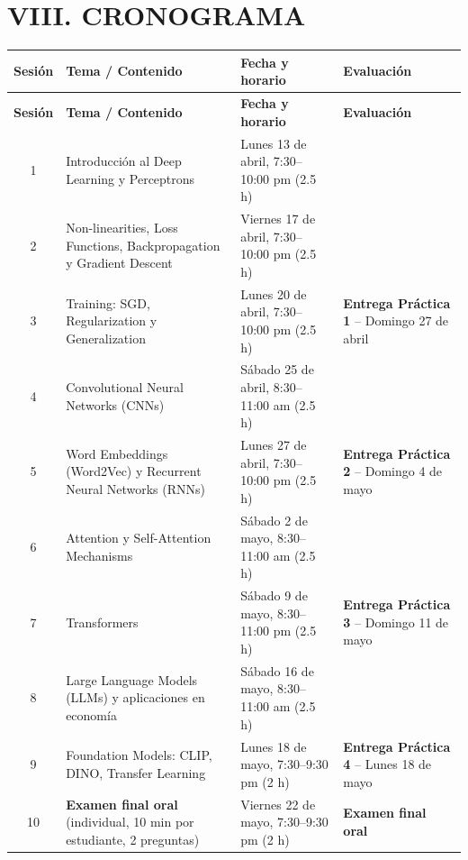 \documentclass[11pt,a4paper]{article}
\begin{document}
\section*{VIII. CRONOGRAMA}

\begin{center}
\begin{longtable}{|c|p{4cm}|p{3.5cm}|p{4.5cm}|}
\hline
\textbf{Sesi\'on} & \textbf{Tema / Contenido} & \textbf{Fecha y horario} & \textbf{Evaluaci\'on} \\
\hline
\endfirsthead
\hline
\textbf{Sesi\'on} & \textbf{Tema / Contenido} & \textbf{Fecha y horario} & \textbf{Evaluaci\'on} \\
\hline
\endhead

1 & Introducci\'on al Deep Learning y Perceptrons & Lunes 13 de abril, 7:30--10:00 pm (2.5 h) & \\
\hline
2 & Non-linearities, Loss Functions, Backpropagation y Gradient Descent & Viernes 17 de abril, 7:30--10:00 pm (2.5 h) & \\
\hline
3 & Training: SGD, Regularization y Generalization & Lunes 20 de abril, 7:30--10:00 pm (2.5 h) & \textbf{Entrega Pr\'actica 1} -- Domingo 27 de abril \\
\hline
4 & Convolutional Neural Networks (CNNs) & S\'abado 25 de abril, 8:30--11:00 am (2.5 h) & \\
\hline
5 & Word Embeddings (Word2Vec) y Recurrent Neural Networks (RNNs) & Lunes 27 de abril, 7:30--10:00 pm (2.5 h) & \textbf{Entrega Pr\'actica 2} -- Domingo 4 de mayo \\
\hline
6 & Attention y Self-Attention Mechanisms & S\'abado 2 de mayo, 8:30--11:00 am (2.5 h) & \\
\hline
7 & Transformers & S\'abado 9 de mayo, 8:30--11:00 pm (2.5 h) & \textbf{Entrega Pr\'actica 3} -- Domingo 11 de mayo \\
\hline
8 & Large Language Models (LLMs) y aplicaciones en econom\'ia & S\'abado 16 de mayo, 8:30--11:00 am (2.5 h) & \\
\hline
9 & Foundation Models: CLIP, DINO, Transfer Learning & Lunes 18 de mayo, 7:30--9:30 pm (2 h) & \textbf{Entrega Pr\'actica 4} -- Lunes 18 de mayo \\
\hline
10 & \textbf{Examen final oral} (individual, 10 min por estudiante, 2 preguntas) & Viernes 22 de mayo, 7:30--9:30 pm (2 h) & \textbf{Examen final oral} \\
\hline
\end{longtable}
\end{center}
\end{document}
